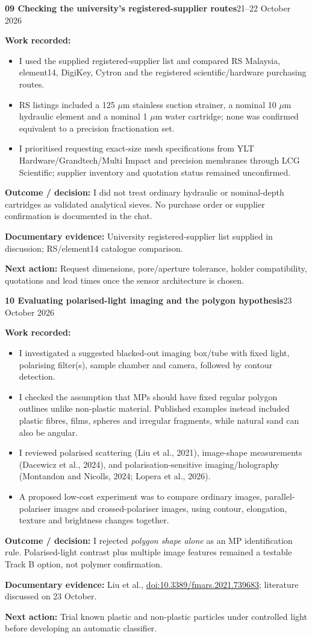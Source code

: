 \documentclass[11pt,a4paper]{article}
\newcommand{\logentry}[3]{%
  \Needspace{13\baselineskip}%
  \vspace{8pt}%
  {\large\bfseries\color{ink}#1 \quad #2}\hfill{\small\color{ink}#3}\par
  \vspace{-3pt}{\color{linecolor}\rule{\linewidth}{.6pt}}\par\vspace{1pt}%
}
\newcommand{\result}[1]{\textbf{Outcome / decision:} #1\par}
\newcommand{\evidence}[1]{\textbf{Documentary evidence:} {\small #1}\par}
\newcommand{\nextstep}[1]{\textbf{Next action:} #1\par}
\begin{document}
\logentry{09}{Checking the university's registered-supplier routes}{21--22 October 2026}
\textbf{Work recorded:}
\begin{itemize}
\item I used the supplied registered-supplier list and compared RS Malaysia, element14, DigiKey, Cytron and the registered scientific/hardware purchasing routes.
\item RS listings included a 125 $\mu$m stainless suction strainer, a nominal 10 $\mu$m hydraulic element and a nominal 1 $\mu$m water cartridge; none was confirmed equivalent to a precision fractionation set.
\item I prioritised requesting exact-size mesh specifications from YLT Hardware/Grandtech/Multi Impact and precision membranes through LCG Scientific; supplier inventory and quotation status remained unconfirmed.
\end{itemize}
\result{I did not treat ordinary hydraulic or nominal-depth cartridges as validated analytical sieves. No purchase order or supplier confirmation is documented in the chat.}
\evidence{University registered-supplier list supplied in discussion; RS/element14 catalogue comparison.}
\nextstep{Request dimensions, pore/aperture tolerance, holder compatibility, quotations and lead times once the sensor architecture is chosen.}

\logentry{10}{Evaluating polarised-light imaging and the polygon hypothesis}{23 October 2026}
\textbf{Work recorded:}
\begin{itemize}
\item I investigated a suggested blacked-out imaging box/tube with fixed light, polarising filter(s), sample chamber and camera, followed by contour detection.
\item I checked the assumption that MPs should have fixed regular polygon outlines unlike non-plastic material. Published examples instead included plastic fibres, films, spheres and irregular fragments, while natural sand can also be angular.
\item I reviewed polarised scattering (Liu et al., 2021), image-shape measurements (Dacewicz et al., 2024), and polarisation-sensitive imaging/holography (Montandon and Nicolls, 2024; Lopera et al., 2026).
\item A proposed low-cost experiment was to compare ordinary images, parallel-polariser images and crossed-polariser images, using contour, elongation, texture and brightness changes together.
\end{itemize}
\result{I rejected \emph{polygon shape alone} as an MP identification rule. Polarised-light contrast plus multiple image features remained a testable Track B option, not polymer confirmation.}
\evidence{Liu et al., \href{https://doi.org/10.3389/fmars.2021.739683}{doi:10.3389/fmars.2021.739683}; literature discussed on 23 October.}
\nextstep{Trial known plastic and non-plastic particles under controlled light before developing an automatic classifier.}
\end{document}
